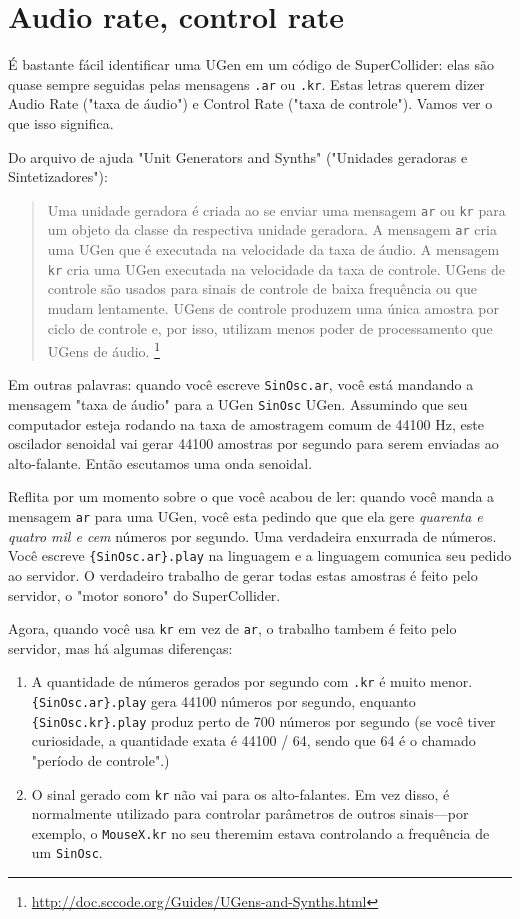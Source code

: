 \section{Audio rate, control rate}

É bastante fácil identificar uma UGen em um código de SuperCollider: elas são quase sempre seguidas pelas mensagens \texttt{.ar} ou \texttt{.kr}. Estas letras querem dizer Audio Rate ("taxa de áudio") e Control Rate ("taxa de controle"). Vamos ver o que isso significa.

Do arquivo de ajuda "Unit Generators and Synths" ("Unidades geradoras e Sintetizadores"): 

\begin{quotation}
Uma unidade geradora é criada ao se enviar uma mensagem \texttt{ar} ou \texttt{kr} para um objeto da classe da respectiva unidade geradora. A mensagem \texttt{ar} cria uma UGen que é executada na velocidade da taxa de áudio. A mensagem \texttt{kr} cria uma UGen executada na velocidade da taxa de controle. UGens de controle são usados para sinais de controle de baixa frequência ou que mudam lentamente. UGens de controle produzem uma única amostra por ciclo de controle e, por isso, utilizam menos poder de processamento que UGens de áudio. \footnote{\url{http://doc.sccode.org/Guides/UGens-and-Synths.html}}
\end{quotation}

Em outras palavras: quando você escreve \texttt{SinOsc.ar}, você está mandando a mensagem "taxa de áudio" para a UGen \texttt{SinOsc} UGen. Assumindo que seu computador esteja rodando na taxa de amostragem comum de 44100 Hz, este oscilador senoidal vai gerar 44100 amostras por segundo para serem enviadas ao alto-falante. Então escutamos uma onda senoidal.

Reflita por um momento sobre o que você acabou de ler: quando você manda a mensagem \texttt{ar} para uma UGen, você esta pedindo que que ela gere \emph{quarenta e quatro mil e cem} números por segundo. Uma verdadeira enxurrada de números. Você escreve \texttt{\{SinOsc.ar\}.play} na linguagem e a linguagem comunica seu pedido ao servidor. O verdadeiro trabalho de gerar todas estas amostras é feito pelo servidor, o "motor sonoro" do SuperCollider.

Agora, quando você usa \texttt{kr} em vez de \texttt{ar}, o trabalho tambem é feito pelo servidor, mas há algumas diferenças:
\begin{enumerate}
\item A quantidade de números gerados por segundo com \texttt{.kr} é muito menor. \texttt{\{SinOsc.ar\}.play} gera 44100 números por segundo, enquanto \texttt{\{SinOsc.kr\}.play} produz perto de 700 números por segundo (se você tiver curiosidade, a quantidade exata é 44100 / 64, sendo que 64 é o chamado "período de controle".)
\item O sinal gerado com \texttt{kr} não vai para os alto-falantes. Em vez disso, é normalmente utilizado para controlar parâmetros de outros sinais---por exemplo, o \texttt{MouseX.kr} no seu theremim estava controlando a frequência de um \texttt{SinOsc}.

\end{enumerate} 

